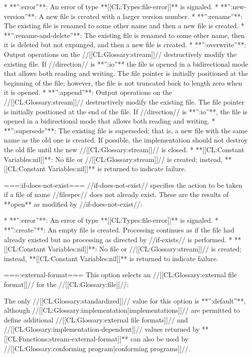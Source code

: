   * **'':error''**: An error of type **[[CL:Types:file-error]]** is signaled.
  * **'':new-version''**: A new file is created with a larger version number.
  * **'':rename''**: The existing file is renamed to some other name and then a new file is created.
  * **'':rename-and-delete''**: The existing file is renamed to some other name, then it is deleted but not expunged, and then a new file is created.
  * **'':overwrite''**: Output operations on the //[[CL:Glossary:stream]]// destructively modify the existing file. If //direction// is **'':io''** the file is opened in a bidirectional mode that allows both reading and writing. The file pointer is initially positioned at the beginning of the file; however, the file is not truncated back to length zero when it is opened.
  * **'':append''**: Output operations on the //[[CL:Glossary:stream]]// destructively modify the existing file. The file pointer is initially positioned at the end of the file. If //direction// is **'':io''**, the file is opened in a bidirectional mode that allows both reading and writing.
  * **'':supersede''**: The existing file is superseded; that is, a new file with the same name as the old one is created. If possible, the implementation should not destroy the old file until the new //[[CL:Glossary:stream]]// is closed.
  * **[[CL:Constant Variables:nil]]**: No file or //[[CL:Glossary:stream]]// is created; instead, **[[CL:Constant Variables:nil]]** is returned to indicate failure.

===:if-does-not-exist===
//if-does-not-exist// specifies the action to be taken if a file of name //filespec// does not already exist. These are the results of **open** as modified by //if-does-not-exist//:

  * **'':error''**: An error of type **[[CL:Types:file-error]]** is signaled.
  * **'':create''**: An empty file is created. Processing continues as if the file had already existed but no processing as directed by //if-exists// is performed.
  * **[[CL:Constant Variables:nil]]**: No file or //[[CL:Glossary:stream]]// is created; instead, **[[CL:Constant Variables:nil]]** is returned to indicate failure.

===:external-format===
This option selects an //[[CL:Glossary:external file format]]// for the //[[CL:Glossary:file]]//:

The only //[[CL:Glossary:standardized]]// value for this option is **'':default''**, although //[[CL:Glossary:implementation|implementations]]// are permitted to define additional //[[CL:Glossary:external file formats]]// and //[[CL:Glossary:implementation-dependent]]// values returned by **[[CL:Functions:stream-external-format]]** can also be used by //[[CL:Glossary:conforming program|conforming programs]]//.

